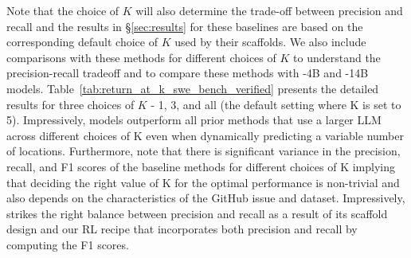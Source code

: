 Note that the choice of $K$ will also determine the trade-off between precision and recall and the results in \S\ref{sec:results} for these baselines are based on the corresponding default choice of $K$ used by their scaffolds. We also include comparisons with these methods for different choices of $K$ to understand the precision-recall tradeoff and to compare these methods with \methodname-4B and \methodname-14B models. Table~\ref{tab:return_at_k_swe_bench_verified} presents the detailed results for three choices of $K$ - 1, 3, and all (the default setting where K is set to 5). Impressively, \methodname models outperform all prior methods that use a larger LLM across different choices of K even when dynamically predicting a variable number of locations. Furthermore, note that there is significant variance in the precision, recall, and F1 scores of the baseline methods for different choices of K implying that deciding the right value of K for the optimal performance is non-trivial and also depends on the characteristics of the GitHub issue and dataset. Impressively, \methodname strikes the right balance between precision and recall as a result of its scaffold design and our RL recipe that incorporates both precision and recall by computing the F1 scores.
